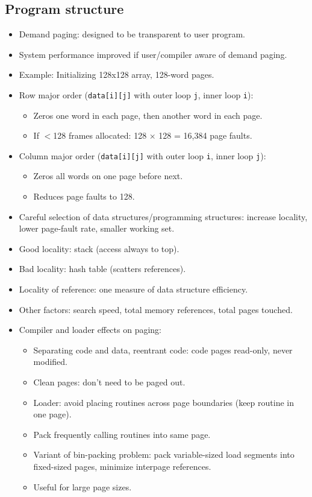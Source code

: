 \subsection{Program structure}
\begin{itemize}
    \item Demand paging: designed to be transparent to user program.
    \item System performance improved if user/compiler aware of demand paging.
    \item Example: Initializing 128x128 array, 128-word pages.
    \item Row major order (\texttt{data[i][j]} with outer loop \texttt{j}, inner loop \texttt{i}):
    \begin{itemize}
        \item Zeros one word in each page, then another word in each page.
        \item If $<$128 frames allocated: 128 $\times$ 128 = 16,384 page faults.
    \end{itemize}
    \item Column major order (\texttt{data[i][j]} with outer loop \texttt{i}, inner loop \texttt{j}):
    \begin{itemize}
        \item Zeros all words on one page before next.
        \item Reduces page faults to 128.
    \end{itemize}
    \item Careful selection of data structures/programming structures: increase locality, lower page-fault rate, smaller working set.
    \item Good locality: stack (access always to top).
    \item Bad locality: hash table (scatters references).
    \item Locality of reference: one measure of data structure efficiency.
    \item Other factors: search speed, total memory references, total pages touched.
    \item Compiler and loader effects on paging:
    \begin{itemize}
        \item Separating code and data, reentrant code: code pages read-only, never modified.
        \item Clean pages: don't need to be paged out.
        \item Loader: avoid placing routines across page boundaries (keep routine in one page).
        \item Pack frequently calling routines into same page.
        \item Variant of bin-packing problem: pack variable-sized load segments into fixed-sized pages, minimize interpage references.
        \item Useful for large page sizes.
    \end{itemize}
\end{itemize}

